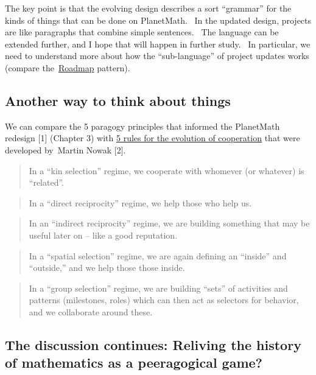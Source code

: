 The key point is that the evolving design describes a sort ``grammar''
for the kinds of things that can be done on PlanetMath.~ In the
updated design, projects are like paragraphs that combine simple
sentences.~ The language can be extended further, and I hope that will
happen in further study.~ In particular, we need to understand more
about how the ``sub-language'' of project updates works (compare
the~\href{http://peeragogy.org/practice/roadmap/}{Roadmap} pattern).

\subsection{Another way to think about things}

We can compare the 5 paragogy principles that informed the PlanetMath
redesign {[}1{]} (Chapter 3) with
\href{http://isites.harvard.edu/fs/docs/icb.topic426436.files/five_rules.pdf}{5
rules for the evolution of cooperation} that were developed by~Martin
Nowak {[}2{]}.

\begin{quote}
In a ``kin selection'' regime, we cooperate with whomever (or
whatever) is ``related''.
\end{quote}

\begin{quote}
In a ``direct reciprocity'' regime, we help those who help us.
\end{quote}

\begin{quote}
In an ``indirect reciprocity'' regime, we are building something that
may be useful later on -- like a good reputation.
\end{quote}

\begin{quote}
In a ``spatial selection'' regime, we are again defining an ``inside''
and ``outside,'' and we help those those inside.
\end{quote}

\begin{quote}
In a ``group selection'' regime, we are building ``sets'' of
activities and patterns (milestones, roles) which can then act as
selectors for behavior, and we collaborate around these.
\end{quote}

\subsection{The discussion continues: Reliving the history of
mathematics as a peeragogical game?}

